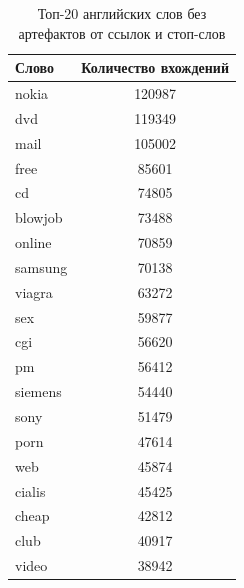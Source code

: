 \begin{table}
	\begin{center}
		\begin{tabular}{|l|c|}
			\hline
			Слово & Количество вхождений\\
			\hline
			nokia & 120987\\
			dvd & 119349\\
			mail & 105002\\
			free & 85601\\
			cd & 74805\\
			blowjob & 73488\\
			online & 70859\\
			samsung & 70138\\
			viagra & 63272\\
			sex & 59877\\
			cgi & 56620\\
			pm & 56412\\
			siemens & 54440\\
			sony & 51479\\
			porn & 47614\\
			web & 45874\\
			cialis & 45425\\
			cheap & 42812\\
			club & 40917\\
			video & 38942\\
			\hline
		\end{tabular}
	\end{center}
	\caption{Топ-20 английских слов без артефактов от ссылок и стоп-слов}
	\label{table_english_words}
\end{table}


